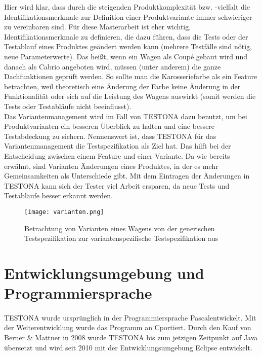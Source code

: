 Hier wird klar, dass durch die steigenden Produktkomplexität bzw. -vielfalt die Identifikationsmerkmale zur Definition einer Produktvariante immer schwieriger zu vereinbaren sind. Für diese Masterarbeit ist eher wichtig, Identifikationsmerkmale zu definieren, die dazu führen, dass die Tests oder der Testablauf eines Produktes geändert werden kann (mehrere Testfälle sind nötig, neue Parameterwerte). Das heißt, wenn ein Wagen als Coup\'{e} gebaut wird und danach als Cabrio angeboten wird, müssen (unter anderem) die ganze Dachfunktionen geprüft werden. So sollte man die Karosseriefarbe als ein Feature betrachten, weil theoretisch eine Änderung der Farbe keine Änderung in der Funktionalität oder sich auf die Leistung des Wagens auswirkt (somit werden die Tests oder Testabläufe nicht beeinflusst). \cite{VarMan2}\\

Das Variantenmanagement wird im Fall von TESTONA dazu benutzt, um bei Produktvarianten ein besseren Überblick zu halten und eine bessere Testabdeckung zu sichern. Nennenswert ist, dass TESTONA für das Variantenmanagement die Testspezifikation als Ziel hat. Das hilft bei der Entscheidung zwischen einem Feature und einer Variante. Da wie bereits erwähnt, sind Varianten Änderungen eines Produktes, in der es mehr Gemeinsamkeiten als Unterschiede gibt. Mit dem Eintragen der Änderungen in TESTONA kann sich der Tester viel Arbeit ersparen, da neue Tests und Testabläufe besser erkannt werden.\\


\begin{figure}[h]
  \begin{center}
    \texttt{[image: varianten.png]}
  		  \caption{Betrachtung von Varianten eines Wagens von der generischen Testspezifikation zur variantenspezifische Testspezifikation aus \cite{VarMan1}}
     \label{doors.bespiel}
  \end{center}
\end{figure}



\newpage
\section{Entwicklungsumgebung und Programmiersprache}
\paragraph{}
TESTONA wurde ursprünglich in der Programmiersprache \glqq Pascal\grqq entwickelt. Mit der Weiterentwicklung wurde das Programm an \glqq C\grqq portiert. Durch den Kauf von Berner \& Mattner in 2008 wurde TESTONA bis zum jetzigen Zeitpunkt auf Java übersetzt und wird seit 2010 mit der Entwicklungsumgebung Eclipse entwickelt.

